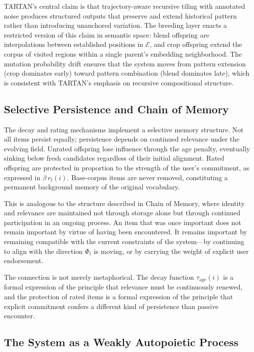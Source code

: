 \documentclass[12pt, a4paper]{article}
\theoremstyle{definition}
\begin{document}
TARTAN's central claim is that trajectory-aware recursive tiling with annotated noise produces structured outputs that preserve and extend historical pattern rather than introducing unanchored variation. The breeding layer enacts a restricted version of this claim in semantic space: blend offspring are interpolations between established positions in $\mathcal{E}$, and crop offspring extend the corpus of visited regions within a single parent's embedding neighborhood. The mutation probability drift ensures that the system moves from pattern extension (crop dominates early) toward pattern combination (blend dominates late), which is consistent with TARTAN's emphasis on recursive compositional structure.

\subsection{Selective Persistence and Chain of Memory}

The decay and rating mechanisms implement a selective memory structure. Not all items persist equally; persistence depends on continued relevance under the evolving field. Unrated offspring lose influence through the age penalty, eventually sinking below fresh candidates regardless of their initial alignment. Rated offspring are protected in proportion to the strength of the user's commitment, as expressed in $\beta\, r_t(i)$. Base-corpus items are never removed, constituting a permanent background memory of the original vocabulary.

This is analogous to the structure described in Chain of Memory, where identity and relevance are maintained not through storage alone but through continued participation in an ongoing process. An item that was once important does not remain important by virtue of having been encountered. It remains important by remaining compatible with the current constraints of the system---by continuing to align with the direction $\Phi_t$ is moving, or by carrying the weight of explicit user endorsement.

The connection is not merely metaphorical. The decay function $\tau_{\mathrm{age}}(i)$ is a formal expression of the principle that relevance must be continuously renewed, and the protection of rated items is a formal expression of the principle that explicit commitment confers a different kind of persistence than passive encounter.

\subsection{The System as a Weakly Autopoietic Process}
\end{document}
